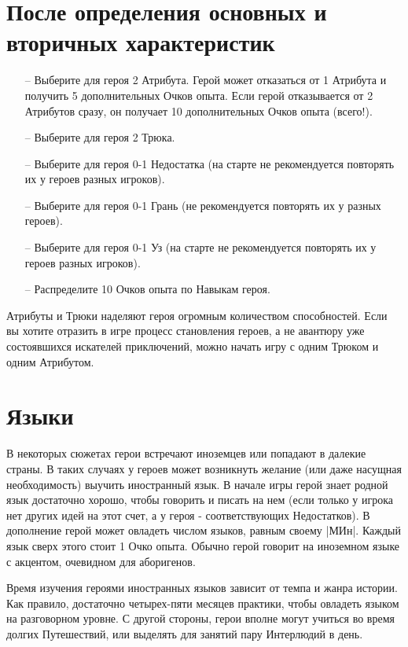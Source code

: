 \section{После определения основных и вторичных характеристик}
\begin{itemize}
\item[--] Выберите для героя 2 Атрибута. Герой может отказаться от 1 Атрибута и получить 5 дополнительных Очков опыта. Если герой отказывается от 2 Атрибутов сразу, он получает 10 дополнительных Очков опыта (всего!).
\item[--] Выберите для героя 2 Трюка.
\item[--] Выберите для героя 0-1 Недостатка (на старте не рекомендуется повторять их у героев разных игроков).
\item[--] Выберите для героя 0-1 Грань (не рекомендуется повторять их у разных героев).
\item[--] Выберите для героя 0-1 Уз (на старте не рекомендуется повторять их у героев разных игроков).
\item[--] Распределите 10 Очков опыта по Навыкам героя.
\end{itemize}
\begin{tcolorbox}
Атрибуты и Трюки наделяют героя огромным количеством способностей. Если вы хотите отразить в игре процесс становления героев, а не авантюру уже состоявшихся искателей приключений, можно начать игру с одним Трюком и одним Атрибутом.
\end{tcolorbox}








\section{Языки}
В некоторых сюжетах герои встречают иноземцев или попадают в далекие страны. В таких случаях у героев может возникнуть желание (или даже насущная необходимость) выучить иностранный язык.
\newline В начале игры герой знает родной язык достаточно хорошо, чтобы говорить и писать на нем (если только у игрока нет других идей на этот счет, а у героя - соответствующих Недостатков). В дополнение герой может овладеть числом языков, равным своему |МИн|. Каждый язык сверх этого стоит 1 Очко опыта. Обычно герой говорит на иноземном языке с акцентом, очевидном для аборигенов. 
\begin{tcolorbox}
    Время изучения героями иностранных языков зависит от темпа и жанра истории. Как правило, достаточно четырех-пяти месяцев практики, чтобы овладеть языком на разговорном уровне. С другой стороны, герои вполне могут учиться во время долгих Путешествий, или выделять для занятий пару Интерлюдий в день.
\end{tcolorbox}


